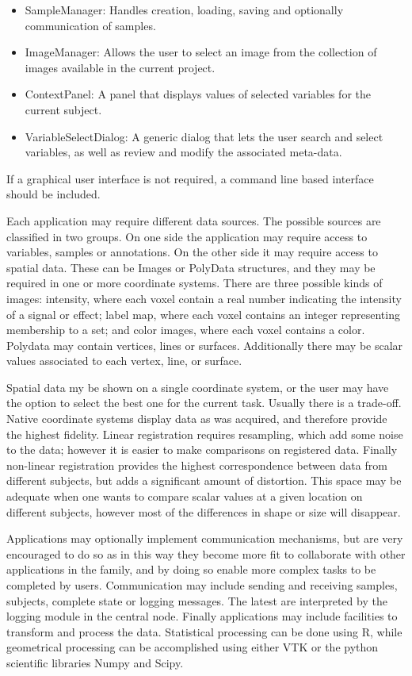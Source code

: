 \begin{itemize}
\item SampleManager: Handles creation, loading, saving and optionally communication of samples.
\item ImageManager: Allows the user to select an image from the collection of images available in the current project.
\item ContextPanel: A panel that displays values of selected variables for the current subject.
\item VariableSelectDialog: A generic dialog that lets the user search and select variables, as well as review and modify the associated meta-data.
\end{itemize}
If a graphical user interface is not required, a command line based interface should be included. 

Each application may require different data sources. The possible sources are classified in two groups. On one side the application may require access to variables, samples or annotations. On the other side it may require access to spatial data. These can be Images or PolyData structures, and they may be required in one or more coordinate systems. There are three possible kinds of images: intensity, where each voxel contain a real number indicating the intensity of a signal or effect; label map, where each voxel contains an integer representing membership to a set; and color images, where each voxel contains a color. Polydata may contain vertices, lines or surfaces. Additionally there may be scalar values associated to each vertex, line, or surface. 

Spatial data my be shown on a single coordinate system, or the user may have the option to select the best one for the current task. Usually there is a trade-off. Native coordinate systems display data as was acquired, and therefore provide the highest fidelity. Linear registration requires resampling, which add some noise to the data; however it is easier to make comparisons on registered data. Finally non-linear registration provides the highest correspondence between data from different subjects, but adds a significant amount of distortion. This space may be adequate when one wants to compare scalar values at a given location on different subjects, however most of the differences in shape or size will disappear.

Applications may optionally implement communication mechanisms, but are very encouraged to do so as in this way they become more fit to collaborate with other applications in the family, and by doing so enable more complex tasks to be completed by users. Communication may include sending and receiving samples, subjects, complete state or logging messages. The latest are interpreted by the logging module in the central node. Finally applications may include facilities to transform and process the data. Statistical processing can be done using R, while geometrical processing can be accomplished using either VTK or the python scientific libraries Numpy and Scipy. 

